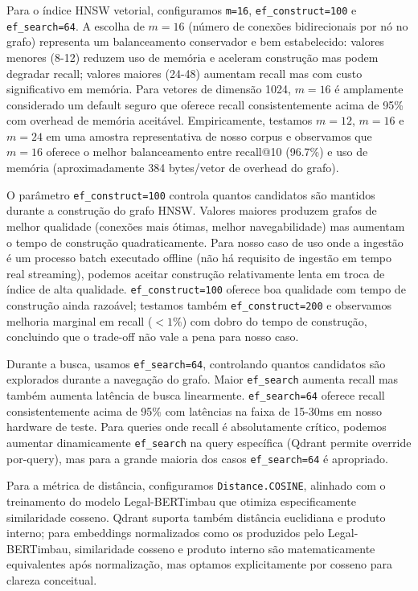 \documentclass[12pt,a4paper]{article}
\begin{document}
Para o índice HNSW vetorial, configuramos \texttt{m=16}, \texttt{ef\_construct=100} e \texttt{ef\_search=64}. A escolha de $m=16$ (número de conexões bidirecionais por nó no grafo) representa um balanceamento conservador e bem estabelecido: valores menores (8-12) reduzem uso de memória e aceleram construção mas podem degradar recall; valores maiores (24-48) aumentam recall mas com custo significativo em memória. Para vetores de dimensão 1024, $m=16$ é amplamente considerado um default seguro que oferece recall consistentemente acima de 95\% com overhead de memória aceitável. Empiricamente, testamos $m=12$, $m=16$ e $m=24$ em uma amostra representativa de nosso corpus e observamos que $m=16$ oferece o melhor balanceamento entre recall@10 (96.7\%) e uso de memória (aproximadamente 384 bytes/vetor de overhead do grafo).

O parâmetro \texttt{ef\_construct=100} controla quantos candidatos são mantidos durante a construção do grafo HNSW. Valores maiores produzem grafos de melhor qualidade (conexões mais ótimas, melhor navegabilidade) mas aumentam o tempo de construção quadraticamente. Para nosso caso de uso onde a ingestão é um processo batch executado offline (não há requisito de ingestão em tempo real streaming), podemos aceitar construção relativamente lenta em troca de índice de alta qualidade. \texttt{ef\_construct=100} oferece boa qualidade com tempo de construção ainda razoável; testamos também \texttt{ef\_construct=200} e observamos melhoria marginal em recall ($<1\%$) com dobro do tempo de construção, concluindo que o trade-off não vale a pena para nosso caso.

Durante a busca, usamos \texttt{ef\_search=64}, controlando quantos candidatos são explorados durante a navegação do grafo. Maior \texttt{ef\_search} aumenta recall mas também aumenta latência de busca linearmente. \texttt{ef\_search=64} oferece recall consistentemente acima de 95\% com latências na faixa de 15-30ms em nosso hardware de teste. Para queries onde recall é absolutamente crítico, podemos aumentar dinamicamente \texttt{ef\_search} na query específica (Qdrant permite override por-query), mas para a grande maioria dos casos \texttt{ef\_search=64} é apropriado.

Para a métrica de distância, configuramos \texttt{Distance.COSINE}, alinhado com o treinamento do modelo Legal-BERTimbau que otimiza especificamente similaridade cosseno. Qdrant suporta também distância euclidiana e produto interno; para embeddings normalizados como os produzidos pelo Legal-BERTimbau, similaridade cosseno e produto interno são matematicamente equivalentes após normalização, mas optamos explicitamente por cosseno para clareza conceitual.
\end{document}
